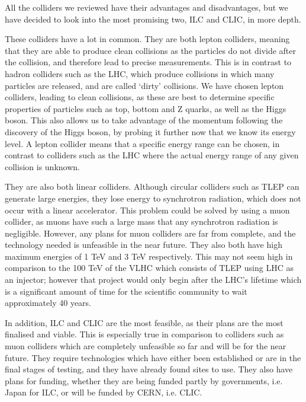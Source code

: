All the colliders we reviewed have their advantages and disadvantages, but we have decided to look into the most promising two, ILC and CLIC, in more depth.

These colliders have a lot in common. They are both lepton colliders, meaning that they are able to produce clean collisions as the particles do not divide after the collision, and therefore lead to precise measurements. This is in contrast to hadron colliders such as the LHC, which produce collisions in which many particles are released, and are called `dirty' collisions. We have chosen lepton colliders, leading to clean collisions, as these are best to determine specific properties of particles such as top, bottom and Z quarks, as well as the Higgs boson. This also allows us to take advantage of the momentum following the discovery of the Higgs boson, by probing it further now that we know its energy level. A lepton collider means that a specific energy range can be chosen, in contrast to colliders such as the LHC where the actual energy range of any given collision is unknown.

They are also both linear colliders. Although circular colliders such as TLEP can generate large energies, they lose energy to synchrotron radiation, which does not occur with a linear accelerator. This problem could be solved by using a muon collider, as muons have such a large mass that any synchrotron radiation is negligible. However, any plans for muon colliders are far from complete, and the technology needed is unfeasible in the near future. They also both have high maximum energies of 1 TeV and 3 TeV respectively. This may not seem high in comparison to the 100 TeV of the VLHC which consists of TLEP using LHC as an injector; however that project would only begin after the LHC's lifetime which is a significant amount of time for the scientific community to wait \textemdash \, approximately 40 years.

In addition, ILC and CLIC are the most feasible, as their plans are the most finalised and viable. This is especially true in comparison to colliders such as muon colliders which are completely unfeasible so far and will be for the near future. They require technologies which have either been established or are in the final stages of testing, and they have already found sites to use. They also have plans for funding, whether they are being funded partly by governments, i.e. Japan for ILC, or will be funded by CERN, i.e. CLIC.